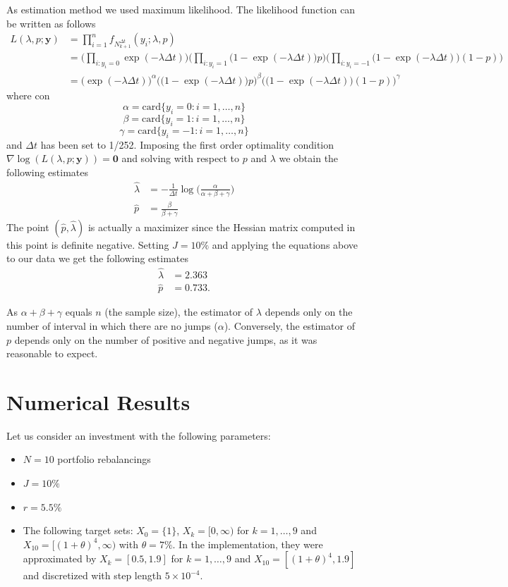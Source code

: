 As estimation method we used maximum likelihood. The likelihood function can be written as follows
\begin{equation*}
\begin{split}
L(\lambda,p;\mathbf{y}) & = \prod_{i=1}^{n}f_{N^{\Delta t}_{k+1}}(y_i;\lambda,p)\\
& =\Big(\prod_{i\colon y_i = 0}\exp(-\lambda\Delta t) \Big)
\Big(\prod_{i\colon y_i=1}\big(1-\exp(-\lambda\Delta t) \big)p \Big)
\Big(\prod_{i\colon y_i=-1}\big(1-\exp(-\lambda\Delta t)\big)(1-p) \Big)\\
& = \Big(\exp(-\lambda\Delta t) \Big)^\alpha
\Big(\big(1-\exp(-\lambda\Delta t) \big)p \Big)^\beta
\Big(\big(1-\exp(-\lambda\Delta t)\big)(1-p) \Big)^\gamma
\end{split}
\end{equation*}
where 
con 
\[ \alpha =  \text{card}\{y_i = 0 \colon i = 1,\ldots,n\}\]
\[ \beta =  \text{card}\{y_i = 1 \colon i = 1,\ldots,n\}\]
\[ \gamma =  \text{card}\{y_i = -1 \colon i = 1,\ldots,n\}\]
and $\Delta t$ has been set to 1/252. Imposing the first order optimality condition $\nabla \log(L(\lambda,p;\mathbf{y}))=\bm{0}$
and solving with respect to $p$ and $\lambda$ we obtain the following estimates
\begin{align}
\widehat{\lambda} &= -\frac{1}{\Delta t}\log\Big(\frac{\alpha}{\alpha+\beta+\gamma}\Big)\\[2ex]
\widehat{p}& = \frac{\beta}{\beta+\gamma}
\end{align}
The point $(\widehat{p},\widehat{\lambda})$ is actually a maximizer since the Hessian matrix computed in this point is definite negative.
Setting $J=10\%$ and applying the equations above to our data we get the following estimates
\begin{align*}
\widehat{\lambda} & = 2.363\\
\widehat{p} & = 0.733.
\end{align*}
\begin{remark}
	As $\alpha+\beta+\gamma$ equals $n$ (the sample size), the estimator of $\lambda$ depends only on the number of interval in which there are no jumps ($\alpha$). Conversely, the estimator of $p$ depends only on the number of positive and negative jumps, as it was reasonable to expect.  
\end{remark}

\section{Numerical Results}\label{sec:TD_results}
Let us consider an investment with the following parameters:
\begin{itemize}
	\item $N = 10$ portfolio rebalancings
	\item $J=10\%$
	\item $r = 5.5\%$
	\item The following target sets: $X_0 = \{1\}$, $X_k = [0,\infty)$ for $k = 1,\ldots,9$ and $X_{10} = [(1+\theta)^4,\infty)$  with $\theta=7\%$. In the implementation, they were approximated by $X_k = [0.5,1.9]$ for $k = 1,\ldots,9$ and $X_{10} = [(1+\theta)^4,1.9]$ and discretized with step length $5\times10^{-4}$.
\end{itemize}

